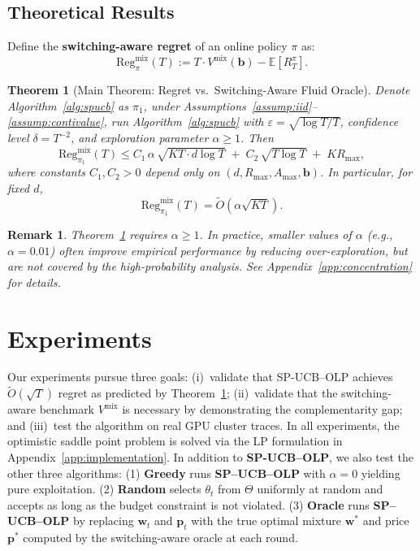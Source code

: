 \documentclass[11pt]{article}
\newtheorem{theorem}{Theorem}
\newtheorem{remark}{Remark}
\newcommand{\bb}{\mathbf{b}}
\newcommand{\bp}{\mathbf{p}}
\newcommand{\bw}{\mathbf{w}}
\newcommand{\E}{\mathbb{E}}
\begin{document}
\subsection{Theoretical Results}
\label{sec:theory}

Define the \textbf{switching-aware regret} of an online policy $\pi$ as:
\[
\mathrm{Reg}^{\mathrm{mix}}_{\pi}(T) := T \cdot V^{\mathrm{mix}}(\bb) - \E[R_T^{\pi}].
\]

\begin{theorem}[Main Theorem: Regret vs.\ Switching-Aware Fluid Oracle]
\label{thm:main}
Denote Algorithm~\ref{alg:spucb} as $\pi_1$, under Assumptions~\ref{assump:iid}--\ref{assump:contivalue}, run Algorithm~\ref{alg:spucb} with
$\varepsilon=\sqrt{\log T/T}$, confidence level $\delta=T^{-2}$, and exploration parameter $\alpha\geq 1$. Then
\[
\mathrm{Reg}_{\pi_1}^{\mathrm{mix}}(T)
\le
C_1\,\alpha\,\sqrt{KT \cdot d \log T}
\;+\;
C_2\,\sqrt{T \log T}
\;+\;
K R_{\max},
\]
where constants $C_1,C_2>0$ depend only on $(d, R_{\max}, A_{\max}, \bb)$. In particular, for fixed $d$,
\[
\mathrm{Reg}_{\pi_1}^{\mathrm{mix}}(T)=\tilde{O}(\alpha\sqrt{KT}).
\]
\end{theorem}
\begin{remark}
    Theorem~\ref{thm:main} requires $\alpha \geq 1$. In practice, smaller values of $\alpha$ (e.g., $\alpha = 0.01$) often improve empirical performance by reducing over-exploration, but are not covered by the high-probability analysis. See Appendix~\ref{app:concentration} for details.
\end{remark}
\section{Experiments}
\label{sec:experiments}
Our experiments pursue three goals: (i)~validate that SP-UCB--OLP achieves $\tilde{O}(\sqrt{T})$ regret as predicted by Theorem~\ref{thm:main}; (ii)~validate that the switching-aware benchmark $V^{\mathrm{mix}}$ is necessary by demonstrating the complementarity gap; and (iii)~test the algorithm on real GPU cluster traces. In all experiments, the optimistic saddle point problem is solved via the LP formulation in Appendix~\ref{app:implementation}. In addition to \textbf{SP-UCB--OLP}, we also test the other three algorithms: (1) \textbf{Greedy} runs \textbf{SP--UCB--OLP} with $\alpha=0$ yielding pure exploitation. (2) \textbf{Random} selects $\theta_t$ from $\Theta$ uniformly at random and accepts as long as the budget constraint is not violated. (3) \textbf{Oracle} runs \textbf{SP--UCB--OLP} by replacing $\bw_t$ and $\bp_t$ with the true optimal mixture $\bw^*$ and price $\bp^*$ computed by the switching-aware oracle at each round. 
\end{document}
